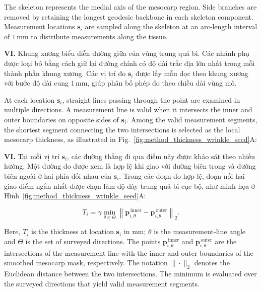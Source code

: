 \documentclass[final,1p,11pt,longtitle]{elsarticle}
\newenvironment{viet}{\par\smallskip\begingroup\color{viColor}\noindent\textbf{VI. }\ignorespaces}{\par\endgroup\smallskip}
\begin{document}
The skeleton represents the medial axis of the mesocarp region. Side branches are removed by retaining the longest geodesic backbone in each skeleton component. Measurement locations $\mathbf{s}_i$ are sampled along the skeleton at an arc-length interval of $1\,\mathrm{mm}$ to distribute measurements along the tissue.

\begin{viet}
Khung xương biểu diễn đường giữa của vùng trung quả bì. Các nhánh phụ được loại bỏ bằng cách giữ lại đường chính có độ dài trắc địa lớn nhất trong mỗi thành phần khung xương. Các vị trí đo $\mathbf{s}_i$ được lấy mẫu dọc theo khung xương với bước độ dài cung $1\,\mathrm{mm}$, giúp phân bố phép đo theo chiều dài vùng mô.
\end{viet}

At each location $\mathbf{s}_i$, straight lines passing through the point are examined in multiple directions. A measurement line is valid when it intersects the inner and outer boundaries on opposite sides of $\mathbf{s}_i$. Among the valid measurement segments, the shortest segment connecting the two intersections is selected as the local mesocarp thickness, as illustrated in Fig.~\ref{fig:method_thickness_wrinkle_seed}A:

\begin{viet}
Tại mỗi vị trí $\mathbf{s}_i$, các đường thẳng đi qua điểm này được khảo sát theo nhiều hướng. Một đường đo được xem là hợp lệ khi giao với đường biên trong và đường biên ngoài ở hai phía đối nhau của $\mathbf{s}_i$. Trong các đoạn đo hợp lệ, đoạn nối hai giao điểm ngắn nhất được chọn làm độ dày trung quả bì cục bộ, như minh họa ở Hình~\ref{fig:method_thickness_wrinkle_seed}A:
\end{viet}

\begin{equation}
T_i=\gamma\min_{\theta\in\Theta}\left\|\mathbf{p}^{\,\mathrm{inner}}_{i,\theta}-\mathbf{p}^{\,\mathrm{outer}}_{i,\theta}\right\|_2.
\end{equation}

Here, $T_i$ is the thickness at location $\mathbf{s}_i$ in mm; $\theta$ is the measurement-line angle and $\Theta$ is the set of surveyed directions. The points $\mathbf{p}^{\,\mathrm{inner}}_{i,\theta}$ and $\mathbf{p}^{\,\mathrm{outer}}_{i,\theta}$ are the intersections of the measurement line with the inner and outer boundaries of the smoothed mesocarp mask, respectively. The notation $\|\cdot\|_2$ denotes the Euclidean distance between the two intersections. The minimum is evaluated over the surveyed directions that yield valid measurement segments.
\end{document}
